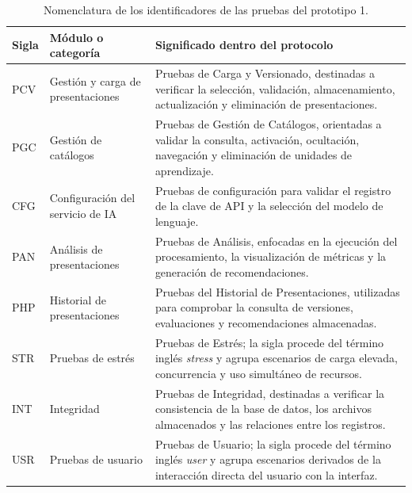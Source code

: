 \documentclass[11pt]{article}
\newcommand{\ttstyle}{%
  \small
  \setlength{\tabcolsep}{6pt}%
  \renewcommand{\arraystretch}{1.25}%
  \arrayrulecolor{azulprofundo}%
}
\newcommand{\hairrule}{%
  \arrayrulecolor{azulregla}\midrule[0.3pt]\arrayrulecolor{azulprofundo}%
}
\begin{document}
\begin{table}[H]
    \centering
    \renewcommand{\arraystretch}{1.2}
    \ttstyle
    \begin{tabularx}{\textwidth}{>{\centering\arraybackslash}p{1.5cm}p{4.6cm}X}
        \toprule
        \textbf{Sigla} & \textbf{Módulo o categoría} & \textbf{Significado dentro del protocolo} \\
        \midrule
        PCV & Gestión y carga de presentaciones & Pruebas de Carga y Versionado, destinadas a verificar la selección, validación, almacenamiento, actualización y eliminación de presentaciones. \\
        \hairrule
        PGC & Gestión de catálogos & Pruebas de Gestión de Catálogos, orientadas a validar la consulta, activación, ocultación, navegación y eliminación de unidades de aprendizaje. \\
        \hairrule
        CFG & Configuración del servicio de IA & Pruebas de configuración para validar el registro de la clave de API y la selección del modelo de lenguaje. \\
        \hairrule
        PAN & Análisis de presentaciones & Pruebas de Análisis, enfocadas en la ejecución del procesamiento, la visualización de métricas y la generación de recomendaciones. \\
        \hairrule
        PHP & Historial de presentaciones & Pruebas del Historial de Presentaciones, utilizadas para comprobar la consulta de versiones, evaluaciones y recomendaciones almacenadas. \\
        \hairrule
        STR & Pruebas de estrés & Pruebas de Estrés; la sigla procede del término inglés \textit{stress} y agrupa escenarios de carga elevada, concurrencia y uso simultáneo de recursos. \\
        \hairrule
        INT & Integridad & Pruebas de Integridad, destinadas a verificar la consistencia de la base de datos, los archivos almacenados y las relaciones entre los registros. \\
        \hairrule
        USR & Pruebas de usuario & Pruebas de Usuario; la sigla procede del término inglés \textit{user} y agrupa escenarios derivados de la interacción directa del usuario con la interfaz. \\
        \bottomrule
    \end{tabularx}
    \caption{Nomenclatura de los identificadores de las pruebas del prototipo 1.}
    \label{tab:nomenclatura-pruebas-prototipo-1}
\end{table}
\end{document}
